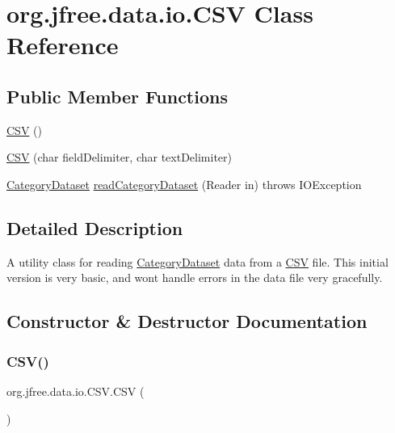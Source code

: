 \hypertarget{classorg_1_1jfree_1_1data_1_1io_1_1_c_s_v}{}\section{org.\+jfree.\+data.\+io.\+C\+SV Class Reference}
\label{classorg_1_1jfree_1_1data_1_1io_1_1_c_s_v}
\subsection*{Public Member Functions}
\begin{DoxyCompactItemize}
\item 
\mbox{\hyperlink{classorg_1_1jfree_1_1data_1_1io_1_1_c_s_v_afb3dc5957d02a4e49d3d85dc014be8db}{C\+SV}} ()
\item 
\mbox{\hyperlink{classorg_1_1jfree_1_1data_1_1io_1_1_c_s_v_aa08388aa9f6a362da9d67493c570eee3}{C\+SV}} (char field\+Delimiter, char text\+Delimiter)
\item 
\mbox{\hyperlink{interfaceorg_1_1jfree_1_1data_1_1category_1_1_category_dataset}{Category\+Dataset}} \mbox{\hyperlink{classorg_1_1jfree_1_1data_1_1io_1_1_c_s_v_a752948180e1d597aa35f3473a2a1698f}{read\+Category\+Dataset}} (Reader in)  throws I\+O\+Exception 
\end{DoxyCompactItemize}


\subsection{Detailed Description}
A utility class for reading \mbox{\hyperlink{}{Category\+Dataset}} data from a \mbox{\hyperlink{classorg_1_1jfree_1_1data_1_1io_1_1_c_s_v}{C\+SV}} file. This initial version is very basic, and won\textquotesingle{}t handle errors in the data file very gracefully. 

\subsection{Constructor \& Destructor Documentation}
\mbox{\label{classorg_1_1jfree_1_1data_1_1io_1_1_c_s_v_afb3dc5957d02a4e49d3d85dc014be8db}} 
\subsubsection{\texorpdfstring{C\+S\+V()}{CSV()}\hspace{0.1cm}{\footnotesize\ttfamily [1/2]}}
{\footnotesize\ttfamily org.\+jfree.\+data.\+io.\+C\+S\+V.\+C\+SV (\begin{DoxyParamCaption}{ }\end{DoxyParamCaption})}

